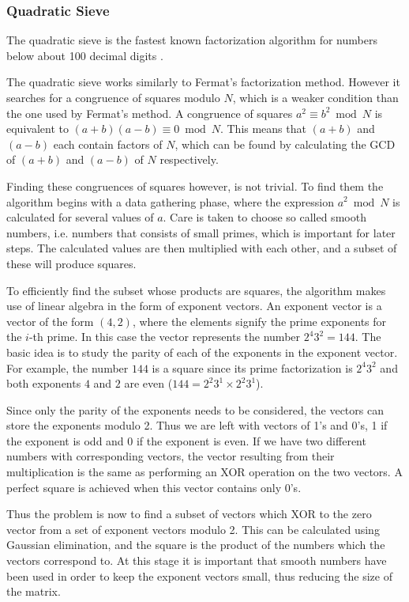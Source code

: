 \documentclass[paper=a4, fontsize=11pt,numbers=endperiod]{scrartcl} %
\numberwithin{equation}{section} %
\numberwithin{figure}{section} %
\numberwithin{table}{section} %
\begin{document}
\subsubsection{Quadratic Sieve}
The quadratic sieve \cite{qsieve} is the fastest known factorization algorithm for numbers below about 100 decimal digits \cite{qsieve2}. 

The quadratic sieve works similarly to Fermat's factorization method.
However it searches for a congruence of squares modulo $N$, which is a weaker condition than the one used by Fermat's method.
A congruence of squares $a^2 \equiv b^2 \bmod N$ is equivalent to $(a+b)(a-b) \equiv 0 \bmod N$.
This means that $(a+b)$ and $(a-b)$ each contain factors of $N$, which can be found by calculating the GCD of $(a+b)$ and $(a-b)$ of $N$ respectively.

Finding these congruences of squares however, is not trivial.
To find them the algorithm begins with a data gathering phase, where the expression $a^2 \bmod N$ is calculated for several values of $a$.
Care is taken to choose so called smooth numbers, i.e. numbers that consists of small primes, which is important for later steps.
The calculated values are then multiplied with each other, and a subset of these will produce squares.

To efficiently find the subset whose products are squares, the algorithm makes use of linear algebra in the form of exponent vectors.
An exponent vector is a vector of the form $(4, 2)$, where the elements signify the prime exponents for the $i$-th prime.
In this case the vector represents the number $2^4 3^2 = 144$.
The basic idea is to study the parity of each of the exponents in the exponent vector.
For example, the number $144$ is a square since its prime factorization is $2^{4}3^2$ and both exponents $4$ and $2$ are even ($144 = 2^2 3^1\times2^2 3^1$).

Since only the parity of the exponents needs to be considered, the vectors can store the exponents modulo 2.
Thus we are left with vectors of 1's and 0's, 1 if the exponent is odd and 0 if the exponent is even.
If we have two different numbers with corresponding vectors, the vector resulting from their multiplication is the same as performing an XOR operation on the two vectors.
A perfect square is achieved when this vector contains only 0's.

Thus the problem is now to find a subset of vectors which XOR to the zero vector from a set of exponent vectors modulo 2.
This can be calculated using Gaussian elimination, and the square is the product of the numbers which the vectors correspond to.
At this stage it is important that smooth numbers have been used in order to keep the exponent vectors small, thus reducing the size of the matrix.
\end{document}
